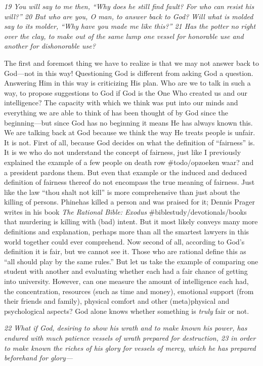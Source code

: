 \emph{19 You will say to me then, ``Why does he still find fault? For
who can resist his will?'' 20 But who are you, O man, to answer back to
God? Will what is molded say to its molder, ``Why have you made me like
this?'' 21 Has the potter no right over the clay, to make out of the
same lump one vessel for honorable use and another for dishonorable
use?}

The first and foremost thing we have to realize is that we may not
answer back to God---not in this way! Questioning God is different from
asking God a question. Answering Him in this way is criticizing His
plan. Who are we to talk in such a way, to propose suggestions to God if
God is the One Who created us and our intelligence? The capacity with
which we think was put into our minds and everything we are able to
think of has been thought of by God since the beginning---but since God
has no beginning it means He has always known this. We are talking back
at God because we think the way He treats people is unfair. It is not.
First of all, because God decides on what the definition of ``fairness''
is. It is we who do not understand the concept of fairness, just like I
previously explained the example of a few people on death row
\#todo/opzoeken waar? and a president pardons them. But even that
example or the induced and deduced definition of fairness thereof do not
encompass the true meaning of fairness. Just like the law ``thou shalt
not kill'' is more comprehensive than just about the killing of persons.
Phinehas killed a person and was praised for it; Dennis Prager writes in
his book \emph{The Rational Bible: Exodus}
\#biblestudy/devotionals/books that murdering is killing with (bad)
intent. But it most likely conveys many more definitions and
explanation, perhaps more than all the smartest lawyers in this world
together could ever comprehend. Now second of all, according to God's
definition it is fair, but we cannot see it. Those who are rational
define this as ``all should play by the same rules.'' But let us take
the example of comparing one student with another and evaluating whether
each had a fair chance of getting into university. However, can one
measure the amount of intelligence each had, the concentration,
resources (such as time and money), emotional support (from their
friends and family), physical comfort and other (meta)physical and
psychological aspects? God alone knows whether something is \emph{truly}
fair or not.

\emph{22 What if God, desiring to show his wrath and to make known his
power, has endured with much patience vessels of wrath prepared for
destruction, 23 in order to make known the riches of his glory for
vessels of mercy, which he has prepared beforehand for glory---}

